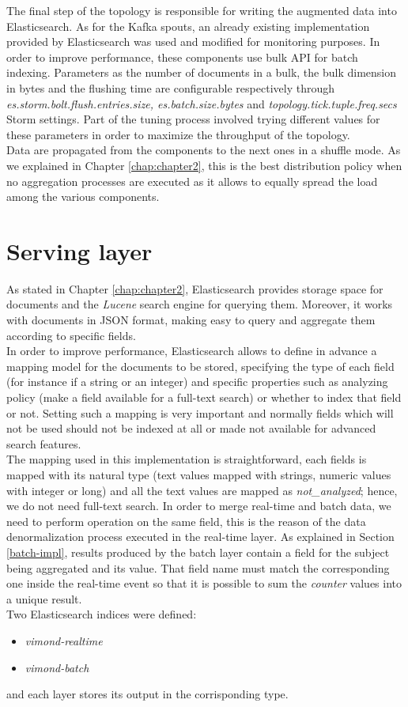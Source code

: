 The final step of the topology is responsible for writing the augmented data into Elasticsearch. As for the Kafka spouts, an already existing implementation provided by Elasticsearch was used and modified for monitoring purposes. In order to improve performance, these components use bulk API for batch indexing. Parameters as the number of documents in a bulk, the bulk dimension in bytes and the flushing time are configurable respectively through \textit{es.storm.bolt.flush.entries.size, es.batch.size.bytes} and \textit{topology.tick.tuple.freq.secs} Storm settings. Part of the tuning process involved trying different values for these parameters in order to maximize the throughput of the topology. \\
Data are propagated from the components to the next ones in a shuffle mode. As we explained in Chapter \ref{chap:chapter2}, this is the best distribution policy when no aggregation processes are executed as it allows to equally spread the load among the various components. 
\section{Serving layer}
As stated in Chapter \ref{chap:chapter2}, Elasticsearch provides storage space for documents and the \textit{Lucene} search engine for querying them. Moreover, it works with documents in JSON format, making easy to query and aggregate them according to specific fields. \\
In order to improve performance, Elasticsearch allows to define in advance a mapping model for the documents to be stored, specifying the type of each field (for instance if a string or an integer) and specific properties such as analyzing policy (make a field available for a full-text search) or whether to index that field or not. Setting such a mapping is very important and normally fields which will not be used should not be indexed at all or made not available for advanced search features.\\
The mapping used in this implementation is straightforward, each fields is mapped with its natural type (text values mapped with strings, numeric values with integer or long) and all the text values are mapped as \textit{not\_analyzed}; hence, we do not need full-text search. In order to merge real-time and batch data, we need to perform operation on the same field, this is the reason of the data denormalization process executed in the real-time layer. As explained in Section \ref{batch-impl}, results produced by the batch layer contain a field for the subject being aggregated and its value. That field name must match the corresponding one inside the real-time event so that it is possible to sum the \textit{counter} values into a unique result.\\
Two Elasticsearch indices were defined:
\begin{itemize}
\item \textit{vimond-realtime}
\item \textit{vimond-batch}
\end{itemize}
and each layer stores its output in the corrisponding type.\\

